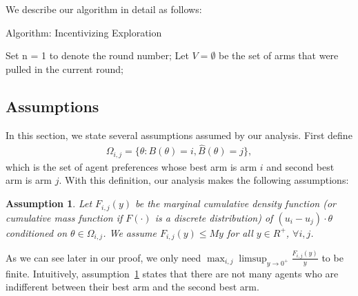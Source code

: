 \documentclass[twoside,11pt]{article}
\newtheorem{assumption}{Assumption}
\begin{document}
We describe our algorithm in detail as follows:


\begin{algorithm}
\caption{Algorithm: Incentivizing Exploration}
\label{Alg1}
\begin{algorithmic}
\STATE Set n = 1 to denote the round number; Let $V=\emptyset$ be the set of arms that were pulled in the current round;
\ENDFOR

\end{algorithmic}
\end{algorithm}


\subsection{Assumptions}
In this section, we state several assumptions assumed by our analysis.  First define
\begin{align}
\Omega_{i,j}=\{\theta:B(\theta)=i, \hat{B}(\theta)=j\}, \nonumber 
\end{align}
which is the set of agent preferences whose best arm is arm $i$ and second best arm is arm $j$. With this definition, our analysis makes the following assumptions:

\begin{assumption} Let $F_{i,j}(y)$ be the marginal cumulative density function (or cumulative mass function if $F(\cdot)$ is a discrete distribution) of $(u_i-u_j)\cdot\theta$ conditioned on $\theta \in \Omega_{i,j}$. We assume $F_{i,j}(y)\leq My$ for all $y\in R^{+}$, $\forall i,j$. 
\label{A1}
\end{assumption}

As we can see later in our proof, we only need $\max_{i,j}\limsup_{y\rightarrow 0^{+}}\frac{F_{i,j}(y)}{y}$ to be finite. Intuitively, assumption~\ref{A1} states that there are not many agents who are indifferent between their best arm and the second best arm. 
\end{document}
